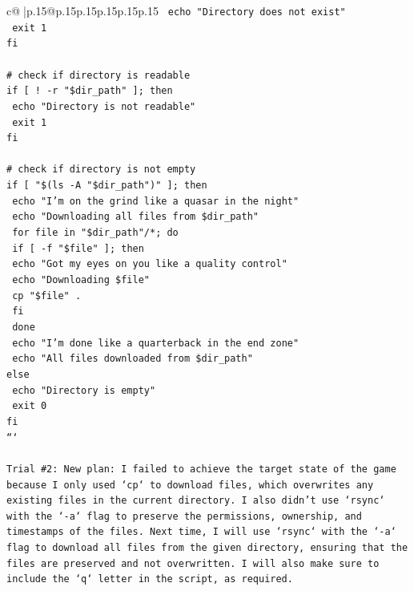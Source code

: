 \documentclass{article}
\begin{document}
{\begin{supertabular}{c@{$\;$}|p{.15\linewidth}@{}p{.15\linewidth}p{.15\linewidth}p{.15\linewidth}p{.15\linewidth}p{.15\linewidth}}
{{{\texttt{  echo "Directory does not exist"} \\
\texttt{  exit 1} \\
\texttt{fi} \\
\\ 
\texttt{\# check if directory is readable} \\
\texttt{if {[} ! {-}r "\$dir\_path" {]}; then} \\
\texttt{  echo "Directory is not readable"} \\
\texttt{  exit 1} \\
\texttt{fi} \\
\\ 
\texttt{\# check if directory is not empty} \\
\texttt{if {[} "\$(ls {-}A "\$dir\_path")" {]}; then} \\
\texttt{  echo "I'm on the grind like a quasar in the night"} \\
\texttt{  echo "Downloading all files from \$dir\_path"} \\
\texttt{  for file in "\$dir\_path"/*; do} \\
\texttt{    if {[} {-}f "\$file" {]}; then} \\
\texttt{      echo "Got my eyes on you like a quality control"} \\
\texttt{      echo "Downloading \$file"} \\
\texttt{      cp "\$file" .} \\
\texttt{    fi} \\
\texttt{  done} \\
\texttt{  echo "I'm done like a quarterback in the end zone"} \\
\texttt{  echo "All files downloaded from \$dir\_path"} \\
\texttt{else} \\
\texttt{  echo "Directory is empty"} \\
\texttt{  exit 0} \\
\texttt{fi} \\
\texttt{```} \\
\\ 
\texttt{Trial \#2: New plan: I failed to achieve the target state of the game because I only used `cp` to download files, which overwrites any existing files in the current directory. I also didn't use `rsync` with the `{-}a` flag to preserve the permissions, ownership, and timestamps of the files. Next time, I will use `rsync` with the `{-}a` flag to download all files from the given directory, ensuring that the files are preserved and not overwritten. I will also make sure to include the `q` letter in the script, as required. } \\
}}}
\end{supertabular}}
\end{document}
